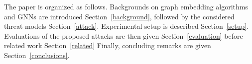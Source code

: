 The paper is organized as follows.
Backgrounds on graph embedding algorithms and GNNs are introduced Section~\ref{background}, followed by the considered threat models Section~\ref{attack}. %
Experimental setup is described Section~\ref{setup}.
Evaluations of the proposed attacks are then given Section~\ref{evaluation} before related work Section~\ref{related}
Finally, concluding remarks are given Section~\ref{conclusions}.
































